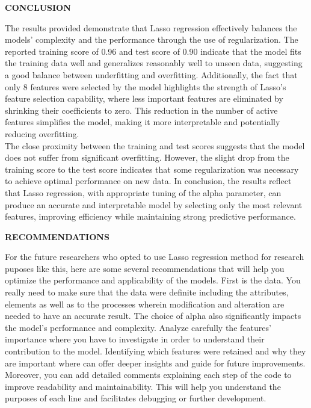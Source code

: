 \documentclass[12pt]{article}
\begin{document}
\newpage
\begin{center}
\textbf{CONCLUSION}
\end{center}

The results provided demonstrate that Lasso regression effectively balances the models’ complexity and the performance through the use of regularization. The reported training score of 0.96 and test score of 0.90 indicate that the model fits the training data well and generalizes reasonably well to unseen data, suggesting a good balance between underfitting and overfitting. Additionally, the fact that only 8 features were selected by the model highlights the strength of Lasso’s feature selection capability, where less important features are eliminated by shrinking their coefficients to zero. This reduction in the number of active features simplifies the model, making it more interpretable and potentially reducing overfitting.\\
\indent The close proximity between the training and test scores suggests that the model does not suffer from significant overfitting. However, the slight drop from the training score to the test score indicates that some regularization was necessary to achieve optimal performance on new data. In conclusion, the results reflect that Lasso regression, with appropriate tuning of the alpha parameter, can produce an accurate and interpretable model by selecting only the most relevant features, improving efficiency while maintaining strong predictive performance.\\

\begin{center}
\textbf{RECOMMENDATIONS}
\end{center}

For the future researchers who opted to use Lasso regression method for research puposes like this, here are some several recommendations that will help you optimize the performance and applicability of the models. First is the data. You really need to make sure that the data were definite including the attributes, elements as well as to the processes wherein modification and alteration are needed to have an accurate result. The choice of alpha also significantly impacts the model’s performance and complexity. Analyze carefully the features’ importance where you have to investigate in order to understand their contribution to the model. Identifying which features were retained and why they are important where can offer deeper insights and guide for future improvements. Moreover, you can add detailed comments explaining each step of the code to improve readability and maintainability. This will help you understand the purposes of each line and facilitates debugging or further development.\\
\end{document}
